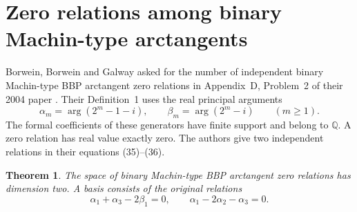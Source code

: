 \documentclass[11pt]{article}
\newtheorem{theorem}{Theorem}[section]
\begin{document}
\section{Zero relations among binary Machin-type arctangents}
\label{bbp:section}
Borwein, Borwein and Galway asked for the number of independent
binary Machin-type BBP arctangent zero relations in Appendix~D,
Problem~2 of their 2004 paper \cite{BBG}. Their Definition~1 uses the real
principal arguments
\[
 \alpha_m=\arg(2^m-1-i),\qquad
 \beta_m=\arg(2^m-i) \qquad(m\ge1).
\]
The formal coefficients of these generators have finite support and
belong to $\mathbb Q$. A zero relation has real value exactly zero.
The authors give two independent relations in their equations
(35)--(36).

\begin{theorem}\label{bbp:main}
The space of binary Machin-type BBP arctangent zero relations has
dimension two. A basis consists of the original relations
\[
    \alpha_1+\alpha_3-2\beta_1=0,\qquad
    \alpha_1-2\alpha_2-\alpha_3=0.
\]
\end{theorem}
\end{document}
